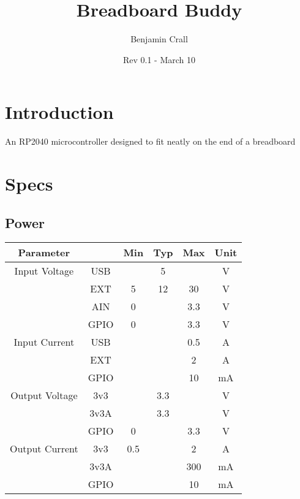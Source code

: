 \documentclass[12pt,letterpaper]{article}
\title{\huge Breadboard Buddy}
\author{{\Large Benjamin Crall}}
\date{Rev 0.1 - March 10}
\begin{document}
\maketitle

\section{Introduction}

An RP2040 microcontroller designed to fit neatly on the end of a breadboard

\section{Specs}

\subsection{Power}
\begin{table}[H]
    \centering
    \begin{tabular}{|cc|c|c|c|c|}\hline
        Parameter      &      & Min & Typ & Max & Unit \\\hline
        Input Voltage  & USB  &     & 5   &     & V    \\
                       & EXT  & 5   & 12  & 30  & V    \\
                       & AIN  & 0   &     & 3.3 & V    \\
                       & GPIO & 0   &     & 3.3 & V    \\\hline
        Input Current  & USB  &     &     & 0.5 & A    \\
                       & EXT  &     &     & 2   & A    \\
                       & GPIO &     &     & 10  & mA   \\\hline
        Output Voltage & 3v3  &     & 3.3 &     & V    \\
                       & 3v3A &     & 3.3 &     & V    \\
                       & GPIO & 0   &     & 3.3 & V    \\\hline
        Output Current & 3v3  & 0.5 &     & 2   & A    \\
                       & 3v3A &     &     & 300 & mA   \\
                       & GPIO &     &     & 10  & mA   \\\hline
    \end{tabular}
\end{table}
\end{document}
